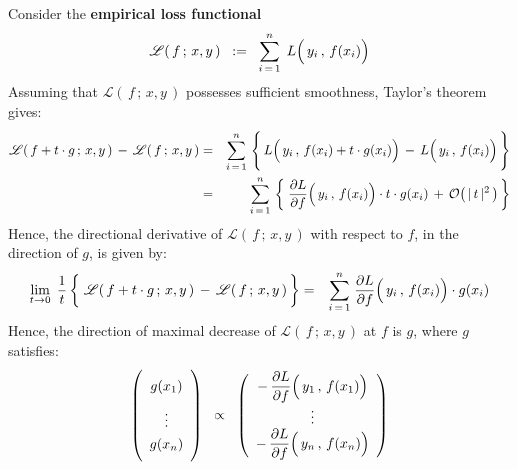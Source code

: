 \noindent
Consider the \textbf{empirical loss functional}
\begin{equation*}
\mathscr{L}(\,f\,;\,x,y\,)
\;\; := \;\;
	\overset{n}{\underset{i\,=\,1}{\sum}}\;\,
	L\!\left(\,y_{i}\,,\,\overset{{\color{white}.}}{f(x_{i})}\right)
\end{equation*}
Assuming that $\mathscr{L}(\,f\,;\,x,y\,)$ possesses sufficient smoothness,
Taylor's theorem gives:
\begin{eqnarray*}
\mathscr{L}(\,f + t \cdot g\,;\,x,y\,)
\,-\,
\mathscr{L}(\,f \,;\,x,y\,)
& = &
	\overset{n}{\underset{i\,=\,1}{\sum}}\,
	\left\{\,
		\overset{{\color{white}1}}{L\!\left(\,y_{i}\,,\,\overset{{\color{white}.}}{f(x_{i}) + t \cdot g(x_{i})}\right)}
		\, - \,
		L\!\left(\,y_{i}\,,\,\overset{{\color{white}.}}{f(x_{i})}\right)
		\,\right\}
\\
& = &
	\overset{n}{\underset{i\,=\,1}{\sum}}\,
	\left\{\;
		\dfrac{\partial L}{\partial f}\!\left(\,y_{i}\,,\,\overset{{\color{white}.}}{f(x_{i})}\right) \cdot t \cdot g(x_{i})
		\, + \,
		\mathcal{O}\!\left(\,\vert\,t\,\vert^{2}\,\right)
		\,\right\}
\end{eqnarray*}
Hence, the directional derivative of $\mathscr{L}(\,f\,;\,x,y\,)$
with respect to $f$, in the direction of $g$, is given by:
\begin{eqnarray*}
\underset{t \rightarrow 0}{\lim}\;\,
\dfrac{1}{t}
\left\{\;
	\overset{{\color{white}1}}{\mathscr{L}(\,f + t \cdot g\,;\,x,y\,)}
	\,-\,
	\mathscr{L}(\,f \,;\,x,y\,)
	\,\right\}
& = &
	\overset{n}{\underset{i\,=\,1}{\sum}}\;
	\dfrac{\partial L}{\partial f}\!\left(\,y_{i}\,,\,\overset{{\color{white}.}}{f(x_{i})}\right) \cdot g(x_{i})
\end{eqnarray*}
Hence, the direction of maximal decrease of $\mathscr{L}(\,f\,;\,x,y\,)$ at $f$ is $g$, where $g$ satisfies:
\begin{equation*}
\left(%
\begin{array}{c}
	\overset{{\color{white}1}}{g(x_{1})}
	\\
	\underset{{\color{white}1}}{\overset{{\color{white}1}}{\vdots}}
	\\
	\underset{{\color{white}1}}{g(x_{n})}
	\end{array}\right)
\;\; \propto \;\;
	\left(\begin{array}{c}
		-\, \dfrac{\partial L}{\partial f}\!\left(\,y_{1}\,,\,\overset{{\color{white}.}}{f(x_{1})}\right)
		\\
		\vdots
		\\
		-\, \dfrac{\partial L}{\partial f}\!\left(\,y_{n}\,,\,\overset{{\color{white}.}}{f(x_{n})}\right)
		\end{array}\right)
\end{equation*}

